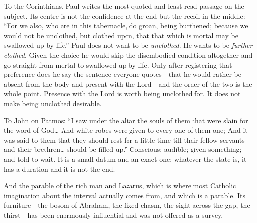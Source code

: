 To the Corinthians, Paul writes the most-quoted and least-read passage on the subject. Its centre is not the confidence at the end but the recoil in the middle: ``For we also, who are in this tabernacle, do groan, being burthened; because we would not be unclothed, but clothed upon, that that which is mortal may be swallowed up by life.'' Paul does not want to be \emph{unclothed}. He wants to be \emph{further clothed}. Given the choice he would skip the disembodied condition altogether and go straight from mortal to swallowed-up-by-life. Only after registering that preference does he say the sentence everyone quotes---that he would rather be absent from the body and present with the Lord---and the order of the two is the whole point. Presence with the Lord is worth being unclothed for. It does not make being unclothed desirable.

To John on Patmos: ``I saw under the altar the souls of them that were slain for the word of God\ldots{} And white robes were given to every one of them one; And it was said to them that they should rest for a little time till their fellow servants and their brethren\ldots{} should be filled up.'' Conscious; audible; given something; and told to wait. It is a small datum and an exact one: whatever the state is, it has a duration and it is not the end.

And the parable of the rich man and Lazarus, which is where most Catholic imagination about the interval actually comes from, and which is a parable. Its furniture---the bosom of Abraham, the fixed chasm, the sight across the gap, the thirst---has been enormously influential and was not offered as a survey.

